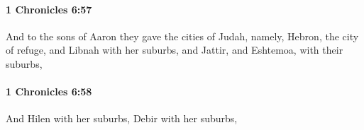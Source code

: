 		\paragraph{1 Chronicles 6:57} %
			\label{1CHRONICLES-6-57}

			And to the sons of Aaron they gave the cities of Judah, namely, Hebron, the city of refuge, and Libnah with her suburbs, and Jattir, and Eshtemoa, with their suburbs,


		\paragraph{1 Chronicles 6:58} %
			\label{1CHRONICLES-6-58}

			And Hilen with her suburbs, Debir with her suburbs,


